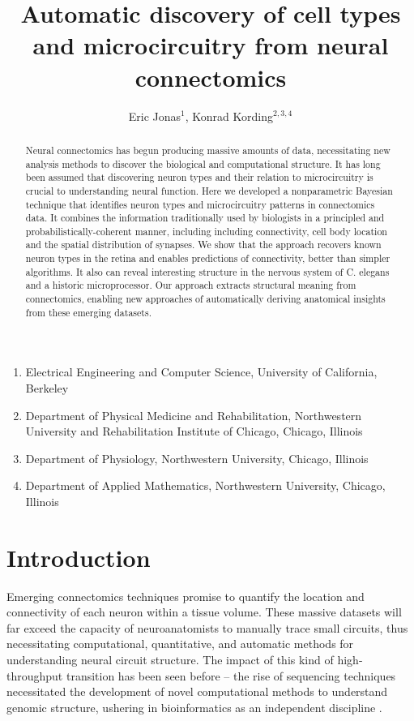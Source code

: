 \documentclass{article}
\title{Automatic discovery of cell types and microcircuitry from neural connectomics}
\author{Eric Jonas$^1$, Konrad Kording$^{2, 3,4}$}
\begin{document}
\maketitle

\begin{small}
\begin{enumerate}
  \item Electrical Engineering and Computer Science, University of California, Berkeley
  \item Department of Physical Medicine and Rehabilitation,
    Northwestern University and Rehabilitation Institute of Chicago,
    Chicago, Illinois
  \item Department of Physiology, Northwestern University, Chicago, Illinois
  \item Department of Applied Mathematics, Northwestern University, Chicago, Illinois
\end{enumerate}
\end{small}

\begin{abstract}
  Neural connectomics has begun producing massive amounts of data,
  necessitating new analysis methods to discover the biological and
  computational structure. It has long been assumed that discovering
  neuron types and their relation to microcircuitry is crucial to
  understanding neural function. Here we developed a nonparametric
  Bayesian technique that identifies neuron types and microcircuitry
  patterns in connectomics data. It combines the information
  traditionally used by biologists in a principled and probabilistically-coherent manner, including  including connectivity, cell body
  location and the spatial distribution of synapses. We show that the
  approach recovers known neuron types in the retina and enables
  predictions of connectivity, better than simpler algorithms. It also
  can reveal interesting structure in the nervous system of
  C. elegans and a historic microprocessor.
  Our approach extracts structural meaning from
  connectomics, enabling new approaches of automatically deriving
  anatomical insights from these emerging datasets.
\end{abstract}

\listoffixmes

\section*{Introduction}
Emerging connectomics techniques \autocite{Morgan2013,Zador2012}
promise to quantify the location and connectivity of each neuron
within a tissue volume. These massive datasets will far exceed the
capacity of neuroanatomists to manually trace small circuits, thus
necessitating computational, quantitative, and automatic methods for
understanding neural circuit structure.  The impact of this kind of
high-throughput transition has been seen before -- the rise of sequencing
techniques necessitated the development of novel computational methods
to understand genomic structure, ushering in bioinformatics as an
independent discipline \autocite{Koboldt2013}. 
\end{document}
